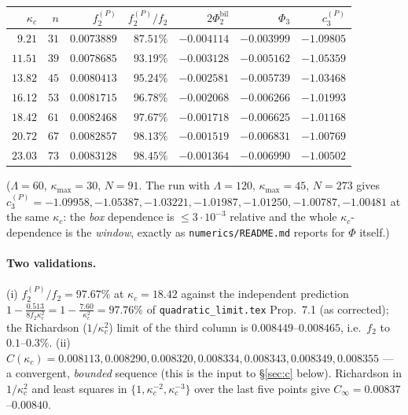 \documentclass[11pt]{article}
\begin{document}
\begin{center}\small
\begin{tabular}{r r r r r r r}\toprule
$\kappa_c$ & $n$ & $f_2^{(P)}$ & $f_2^{(P)}/f_2$ & $2\Phi_2^{\mathrm{bil}}$ & $\Phi_3$ &
$c_3^{(P)}$\\\midrule
$9.21$ & $31$ & $0.0073889$ & $87.51\%$ & $-0.004114$ & $-0.003999$ & $-1.09805$\\
$11.51$ & $39$ & $0.0078685$ & $93.19\%$ & $-0.003128$ & $-0.005162$ & $-1.05359$\\
$13.82$ & $45$ & $0.0080413$ & $95.24\%$ & $-0.002581$ & $-0.005739$ & $-1.03468$\\
$16.12$ & $53$ & $0.0081715$ & $96.78\%$ & $-0.002068$ & $-0.006266$ & $-1.01993$\\
$18.42$ & $61$ & $0.0082468$ & $97.67\%$ & $-0.001718$ & $-0.006625$ & $-1.01168$\\
$20.72$ & $67$ & $0.0082857$ & $98.13\%$ & $-0.001519$ & $-0.006831$ & $-1.00769$\\
$23.03$ & $73$ & $0.0083128$ & $98.45\%$ & $-0.001364$ & $-0.006990$ & $-1.00502$\\
\bottomrule\end{tabular}\end{center}

($\Lambda=60$, $\kappa_{\max}=30$, $N=91$.  The run with $\Lambda=120$, $\kappa_{\max}=45$,
$N=273$ gives $c_3^{(P)}=-1.09958,-1.05387,-1.03221,-1.01987,-1.01250,-1.00787,-1.00481$ at the
same $\kappa_c$: the \emph{box} dependence is $\le3\cdot10^{-3}$ relative and the whole
$\kappa_c$-dependence is the \emph{window}, exactly as \texttt{numerics/README.md} reports for
$\Phi$ itself.)

\paragraph{Two validations.}  (i) $f_2^{(P)}/f_2=97.67\%$ at $\kappa_c=18.42$ against the
independent prediction $1-\frac{0.513}{8f_2\kappa_c^2}=1-\frac{7.60}{\kappa_c^2}=97.76\%$ of
\texttt{quadratic\_limit.tex} Prop.~7.1 (as corrected); the Richardson ($1/\kappa_c^2$) limit of
the third column is $0.008449$--$0.008465$, i.e.\ $f_2$ to $0.1$--$0.3\%$.
(ii) $C(\kappa_c)=0.008113,0.008290,0.008320,0.008334,0.008343,0.008349,0.008355$ --- a convergent,
\emph{bounded} sequence (this is the input to \S\ref{sec:c} below).  Richardson in $1/\kappa_c^2$
and least squares in $\{1,\kappa_c^{-2},\kappa_c^{-3}\}$ over the last five points give
$C_\infty=0.00837$--$0.00840$.
\end{document}
